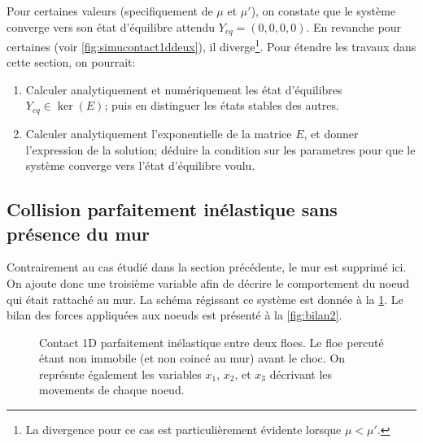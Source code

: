 \noindent Pour certaines valeurs (specifiquement de $\mu$ et $\mu'$), on constate que le système converge vers son état d'équilibre attendu $Y_{eq} = (0,0,0,0)$. En revanche pour certaines (voir \cref{fig:simucontact1ddeux}), il diverge\footnote{La divergence pour ce cas est particulièrement évidente lorsque $\mu < \mu'$.}. Pour étendre les travaux dans cette section, on pourrait:
\begin{enumerate}
    \item Calculer analytiquement et numériquement les état d'équilibres $Y_{eq} \in \ker(E)$; puis en distinguer les états stables des autres.
    \item Calculer analytiquement l'exponentielle de la matrice $E$, et donner l'expression de la solution; déduire la condition sur les parametres pour que le système converge vers l'état d'équilibre voulu.
\end{enumerate} 








\subsection{Collision parfaitement inélastique sans présence du mur}

Contrairement au cas étudié dans la section précédente, le mur est supprimé ici. On ajoute donc une troisième variable afin de décrire le comportement du noeud qui était rattaché au mur. La schéma régissant ce système est donnée à la \cref{fig:contact1d2}. Le bilan des forces appliquées aux noeuds est présenté à la \cref{fig:bilan2}.

\begin{figure}[!h]
    \centering
    \caption{Contact 1D parfaitement inélastique entre deux floes. Le floe percuté étant non immobile (et non coincé au mur) avant le choc. On représnte également les variables $x_1$, $x_2$, et $x_3$ décrivant les movements de chaque noeud.}
    \label{fig:contact1d2}
\end{figure}

